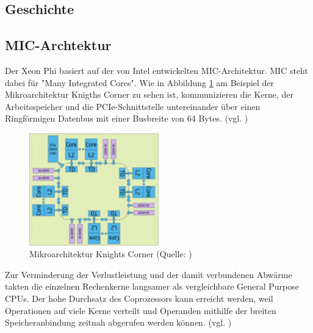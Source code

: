 \documentclass[../main.tex]{subfiles}
\begin{document}
\subsection{Geschichte}
\subsection{MIC-Archtektur}
Der Xeon Phi basiert auf der von Intel entwickelten MIC-Architektur. MIC steht dabei für "Many Integrated Cores". 
Wie in Abbildung \ref{pic:knightscorner} am Beispiel der Mikroarchitektur Knigths Corner zu sehen ist, kommunizieren die Kerne, der Arbeitsspeicher und die PCIe-Schnittstelle untereinander über einen Ringförmigen Datenbus mit einer Busbreite von 64 Bytes. (vgl. \cite{xeonphiJumpstart})
\begin{figure}
    \centering 
       \includegraphics[width=0.5\textwidth]{../images/Schmidt/intel_mic_diagram.jpg} 
    \caption {Mikroarchitektur Knights Corner (Quelle: \parencite{xeonphiJumpstart})}
    \label{pic:knightscorner} 
\end{figure}
Zur Verminderung der Verlustleistung und der damit verbundenen Abwärme takten die einzelnen Rechenkerne langsamer als vergleichbare General Purpose CPUs. Der hohe Durchsatz des Coprozessors kann erreicht werden, weil Operationen auf viele Kerne verteilt und Operanden mithilfe der breiten Speicheranbindung zeitnah abgerufen werden können. (vgl. \cite{xeonphiJumpstart})
\end{document}
